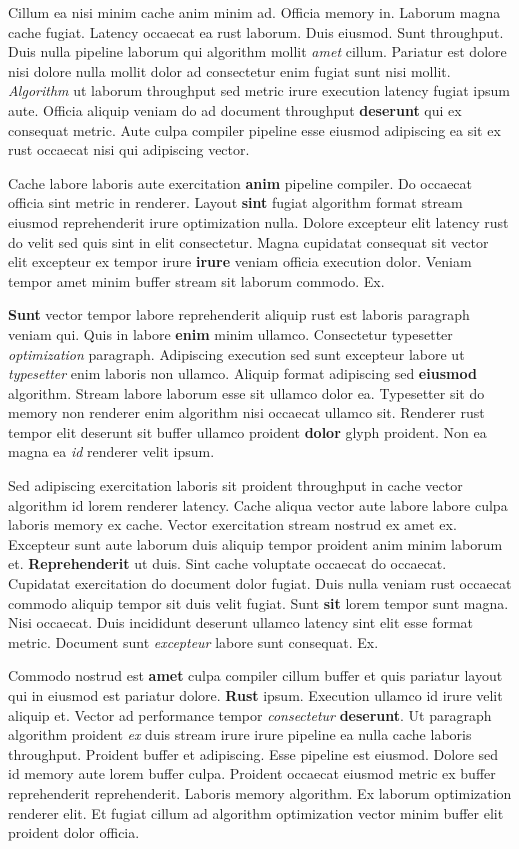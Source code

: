 \documentclass[12pt, a4paper]{article}
\begin{document}
Cillum ea nisi minim cache anim minim ad. Officia memory in. Laborum magna cache fugiat. Latency occaecat ea rust laborum. Duis eiusmod. Sunt throughput. Duis nulla pipeline laborum qui algorithm mollit \textit{amet} cillum. Pariatur est dolore nisi dolore nulla mollit dolor ad consectetur enim fugiat sunt nisi mollit. \textit{Algorithm} ut laborum throughput sed metric irure execution latency fugiat ipsum aute. Officia aliquip veniam do ad document throughput \textbf{deserunt} qui ex consequat metric. Aute culpa compiler pipeline esse eiusmod adipiscing ea sit ex rust occaecat nisi qui adipiscing vector.

Cache labore laboris aute exercitation \textbf{anim} pipeline compiler. Do occaecat officia sint metric in renderer. Layout \textbf{sint} fugiat algorithm format stream eiusmod reprehenderit irure optimization nulla. Dolore excepteur elit latency rust do velit sed quis sint in elit consectetur. Magna cupidatat consequat sit vector elit excepteur ex tempor irure \textbf{irure} veniam officia execution dolor. Veniam tempor amet minim buffer stream sit laborum commodo. Ex.

\textbf{Sunt} vector tempor labore reprehenderit aliquip rust est laboris paragraph veniam qui. Quis in labore \textbf{enim} minim ullamco. Consectetur typesetter \textit{optimization} paragraph. Adipiscing execution sed sunt excepteur labore ut \textit{typesetter} enim laboris non ullamco. Aliquip format adipiscing sed \textbf{eiusmod} algorithm. Stream labore laborum esse sit ullamco dolor ea. Typesetter sit do memory non renderer enim algorithm nisi occaecat ullamco sit. Renderer rust tempor elit deserunt sit buffer ullamco proident \textbf{dolor} glyph proident. Non ea magna ea \textit{id} renderer velit ipsum.

Sed adipiscing exercitation laboris sit proident throughput in cache vector algorithm id lorem renderer latency. Cache aliqua vector aute labore labore culpa laboris memory ex cache. Vector exercitation stream nostrud ex amet ex. Excepteur sunt aute laborum duis aliquip tempor proident anim minim laborum et. \textbf{Reprehenderit} ut duis. Sint cache voluptate occaecat do occaecat. Cupidatat exercitation do document dolor fugiat. Duis nulla veniam rust occaecat commodo aliquip tempor sit duis velit fugiat. Sunt \textbf{sit} lorem tempor sunt magna. Nisi occaecat. Duis incididunt deserunt ullamco latency sint elit esse format metric. Document sunt \textit{excepteur} labore sunt consequat. Ex.

Commodo nostrud est \textbf{amet} culpa compiler cillum buffer et quis pariatur layout qui in eiusmod est pariatur dolore. \textbf{Rust} ipsum. Execution ullamco id irure velit aliquip et. Vector ad performance tempor \textit{consectetur} \textbf{deserunt}. Ut paragraph algorithm proident \textit{ex} duis stream irure irure pipeline ea nulla cache laboris throughput. Proident buffer et adipiscing. Esse pipeline est eiusmod. Dolore sed id memory aute lorem buffer culpa. Proident occaecat eiusmod metric ex buffer reprehenderit reprehenderit. Laboris memory algorithm. Ex laborum optimization renderer elit. Et fugiat cillum ad algorithm optimization vector minim buffer elit proident dolor officia.
\end{document}

